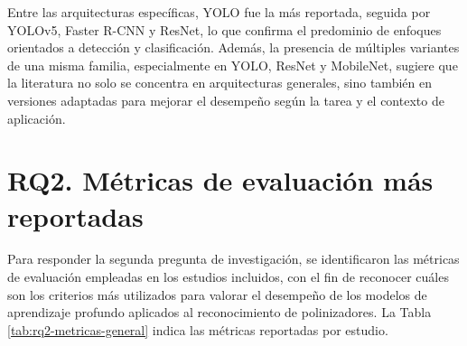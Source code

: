 \endgroup

\vspace{-1.0 cm}
Entre las arquitecturas específicas, YOLO fue la más reportada, seguida por YOLOv5, Faster R-CNN y ResNet, lo que confirma el predominio de enfoques orientados a detección y clasificación. Además, la presencia de múltiples variantes de una misma familia, especialmente en YOLO, ResNet y MobileNet, sugiere que la literatura no solo se concentra en arquitecturas generales, sino también en versiones adaptadas para mejorar el desempeño según la tarea y el contexto de aplicación.



\section{RQ2. Métricas de evaluación más reportadas}

Para responder la segunda pregunta de investigación, se identificaron las métricas de evaluación empleadas en los estudios incluidos, con el fin de reconocer cuáles son los criterios más utilizados para valorar el desempeño de los modelos de aprendizaje profundo aplicados al reconocimiento de polinizadores. La Tabla \ref{tab:rq2-metricas-general} indica las métricas reportadas por estudio.  \\

\begingroup
\newcommand{\marca}{\(\times\)}

\setlength{\tabcolsep}{2pt}
\renewcommand{\arraystretch}{1.05}
\tiny

